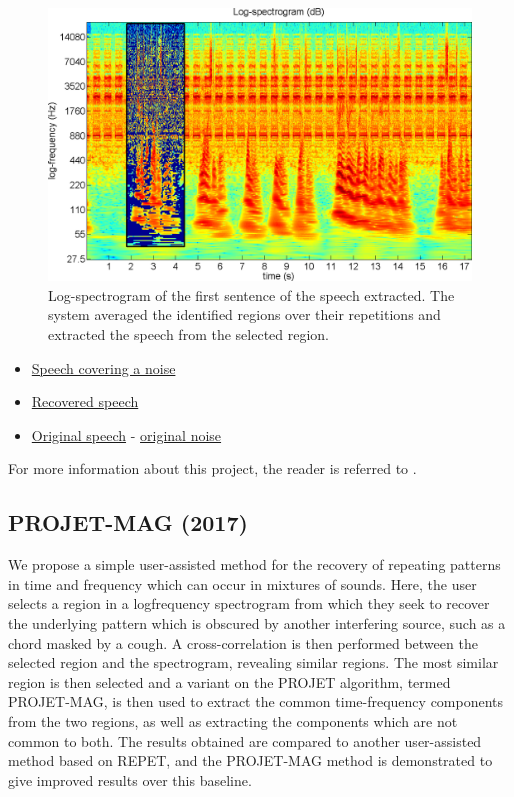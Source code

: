 \documentclass{article}
\begin{document}
\begin{figure}[!htb]
\centering
\includegraphics[width=\columnwidth]{Images/urepet_example3b.png}
\caption{Log-spectrogram of the first sentence of the speech extracted. The system averaged the identified regions over their repetitions and extracted the speech from the selected region.}
\label{fig:urepet_example3b}
\end{figure}

\begin{itemize}[noitemsep,topsep=0pt]
\item \href{Audio/uREPET/speech&noise.wav}{Speech covering a noise}
\item \href{Audio/uREPET/speech-noise.wav}{Recovered speech}
\item \href{Audio/uREPET/speech.wav}{Original speech} - \href{Audio/REPET/noise.wav}{original noise}
\end{itemize}

For more information about this project, the reader is referred to \cite{inproceedings_rafii_apr2015}.


\subsection{PROJET-MAG (2017)}
\label{ssec:projet-mag}

We propose a simple user-assisted method for the recovery of repeating patterns in time and frequency which can occur in mixtures of sounds. Here, the user selects a region in a logfrequency spectrogram from which they seek to recover the underlying pattern which is obscured by another interfering source, such as a chord masked by a cough. A cross-correlation is then performed between the selected region and the spectrogram, revealing similar regions. The most similar region is then selected and a variant on the PROJET algorithm, termed PROJET-MAG, is then used to extract the common time-frequency components from the two regions, as well as extracting the components which are not common to both. The results obtained are compared to another user-assisted method based on REPET, and the PROJET-MAG method is demonstrated to give improved results over this baseline.
\end{document}
